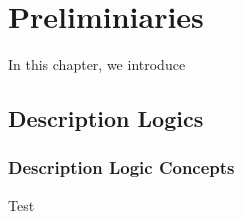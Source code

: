 
\chapter{Preliminiaries}
\label{cha:preliminiaries}

In this chapter, we introduce 


\section{Description Logics}
\label{sec:description-logics}

\subsection{Description Logic Concepts}
\label{sec:dl-concepts}

\begin{defi}
  Test
\end{defi}

